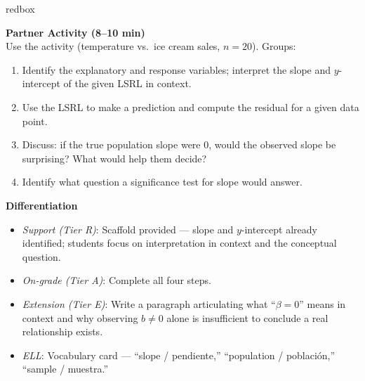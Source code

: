 \documentclass[10pt]{article}
\begin{document}
\begin{skillbox}{redbox}
\begin{minipage}[t]{0.48\linewidth}
    \textbf{Partner Activity (8--10 min)}\\
    Use the activity (temperature vs.\ ice cream sales, $n = 20$). Groups:
    \begin{enumerate}
        \item Identify the explanatory and response variables; interpret the slope
              and $y$-intercept of the given LSRL in context.
        \item Use the LSRL to make a prediction and compute the residual for a
              given data point.
        \item Discuss: if the true population slope were 0, would the observed
              slope be surprising? What would help them decide?
        \item Identify what question a significance test for slope would answer.
    \end{enumerate}
\end{minipage}
\hfill
\begin{minipage}[t]{0.48\linewidth}
    \textbf{Differentiation}
    \begin{itemize}
        \item \textit{Support (Tier R)}: Scaffold provided --- slope and $y$-intercept
              already identified; students focus on interpretation in context and the
              conceptual question.
        \item \textit{On-grade (Tier A)}: Complete all four steps.
        \item \textit{Extension (Tier E)}: Write a paragraph articulating what
              ``$\beta = 0$'' means in context and why observing $b \ne 0$ alone
              is insufficient to conclude a real relationship exists.
        \item \textit{ELL}: Vocabulary card --- ``slope / pendiente,''
              ``population / poblaci\'on,'' ``sample / muestra.''
    \end{itemize}
\end{minipage}
\end{skillbox}
\end{document}
